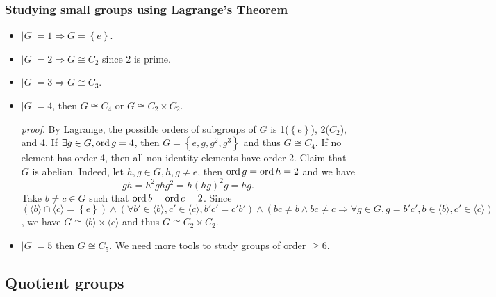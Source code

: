 \documentclass[a4paper]{article}
\begin{document}
\subsubsection{Studying small groups using Lagrange's Theorem}
\begin{example}
  \begin{itemize}
    \item $|G|=1 \Rightarrow G=\left\{ e\right\}$.
    \item $ |G|=2 \Rightarrow G \cong C_2 $ since 2 is prime.
    \item $|G|=3 \Rightarrow G \cong C_3$.
    \item $|G|=4$, then $ G \cong C_4 $ or $ G \cong C_2\times C_2 $.

      \textit{proof}. By Lagrange, the possible orders of subgroups
      of $G$ is 1($ \left\{ e\right\} $), 2($C_2$), and 4. If $
      \exists g\in G, \operatorname{ord} g=4$, then $ G=\left\{ e,g,g^2,g^3\right\}
      $ and thus $ G \cong C_4 $. If no element has order 4, then all
      non-identity elements have order 2. Claim that $G$ is abelian.
      Indeed, let $ h,g\in G, h,g\neq e $, then $ \operatorname{ord} g=\operatorname{ord} h=2 $ and we have
      \[
        gh=h^2ghg^2=h(hg)^2g=hg
      .\]
      Take $ b\neq c\in G $ such that $\operatorname{ord} b=\operatorname{ord} c=2$. Since $
      (\langle b \rangle \cap \langle c \rangle = \left\{ e\right\})
      \land (\forall b'\in \langle b \rangle,c'\in \langle c \rangle,
      b'c'=c'b') \land (bc\neq b \land bc\neq c \Rightarrow \forall
        g\in G, g=b'c', b\in \langle b \rangle, c'\in \langle c \rangle
      )   $, we have $ G \cong \langle b \rangle \times \langle c
      \rangle $ and thus $ G \cong C_2 \times C_2 $.
    \item $ |G|=5 $ then $ G \cong C_5 $. We need more tools to study
      groups of order $ \ge 6 $.
  \end{itemize}
\end{example}
\subsection{Quotient groups}
\end{document}
